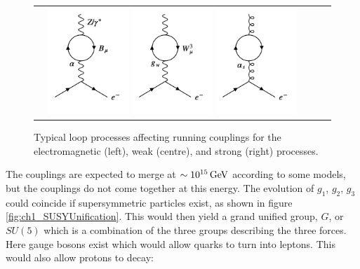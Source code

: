 \begin{figure}[!htb]
  \begin{center}
    \begin{tabular}{ccc}
      \includegraphics[width=0.3\textwidth]{images/web_feynman/image_5.png}
      \includegraphics[width=0.3\textwidth]{images/web_feynman/image_6.png}
      \includegraphics[width=0.3\textwidth]{images/web_feynman/image_7.png}
    \end{tabular}
    \caption[Loop processes affecting running couplings]{Typical loop processes affecting running couplings for the electromagnetic (left), weak (centre), and strong (right) processes.}
    \label{fig:ch1_runningCoupling}
  \end{center}
\end{figure}

The couplings are expected to merge at $\sim 10^{15}\mathrm{\,GeV}$ according to some models, but the couplings do not come together at this energy.  The evolution of $g_1$, $g_2$, $g_3$ could coincide if supersymmetric particles exist, as shown in figure \ref{fig:ch1_SUSYUnification}.  This would then yield a grand unified group, $G$, or $SU(5)$ which is a combination of the three groups describing the three forces.  Here gauge bosons exist which would allow quarks to turn into leptons.  This would also allow protons to decay:

